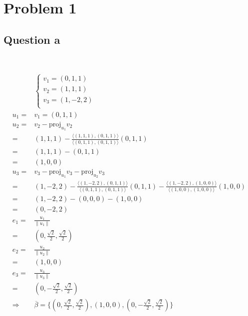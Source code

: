 \documentclass{article}
\def\proj{\text{proj}}
\begin{document}
\section{Problem 1}

\subsection{Question a}

~

\begin{equation*}
    \begin{split}
        &\begin{cases}
            v_1=(0,1,1)\\
            v_2=(1,1,1)\\
            v_3=(1,-2,2)\\
        \end{cases}\\
        u_1=&v_1=(0,1,1)\\
        u_2=&v_2-\proj_{u_1}v_2\\
        =&(1,1,1)-\frac{\langle(1,1,1),(0,1,1)\rangle}{\langle(0,1,1),(0,1,1)\rangle}(0,1,1)\\
        =&(1,1,1)-(0,1,1)\\
        =&(1,0,0)\\
        u_3=&v_3-\proj_{u_1}v_3-\proj_{u_2}v_3\\
        =&(1,-2,2)-\frac{\langle(1,-2,2),(0,1,1)\rangle}{\langle(0,1,1),(0,1,1)\rangle}(0,1,1)-\frac{\langle(1,-2,2),(1,0,0)\rangle}{\langle(1,0,0),(1,0,0)\rangle}(1,0,0)\\
        =&(1,-2,2)-(0,0,0)-(1,0,0)\\
        =&(0,-2,2)\\
        e_1=&\frac{u_1}{\|u_1\|}\\
        =&(0,\frac{\sqrt{2}}{2},\frac{\sqrt{2}}{2})\\
        e_2=&\frac{u_2}{\|u_2\|}\\
        =&(1,0,0)\\
        e_3=&\frac{u_3}{\|u_3\|}\\
        =&(0,-\frac{\sqrt{2}}{2},\frac{\sqrt{2}}{2})\\
        \Rightarrow&\overline{\beta}=\{(0,\frac{\sqrt{2}}{2},\frac{\sqrt{2}}{2}),(1,0,0),(0,-\frac{\sqrt{2}}{2},\frac{\sqrt{2}}{2})\}\\
    \end{split}
\end{equation*}
\end{document}
